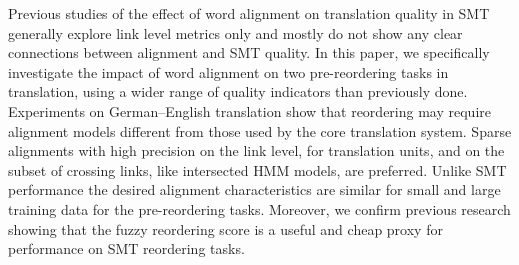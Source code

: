 Previous studies of the effect of word alignment on translation quality in SMT generally explore link level metrics only and mostly do not show any clear connections between alignment and SMT quality. In this paper, we specifically investigate the impact of word alignment on two pre-reordering tasks in translation, using a wider range of quality indicators than previously done. Experiments on German--English translation show that reordering may require alignment models different from those used by the core translation system. Sparse alignments with high precision on the link level, for translation units, and on the subset of crossing links, like intersected HMM models, are preferred. Unlike SMT performance the desired alignment characteristics are similar for small and large training data for the  pre-reordering tasks. Moreover, we confirm previous research showing that the fuzzy reordering score is a useful and cheap proxy for performance on SMT reordering tasks.
